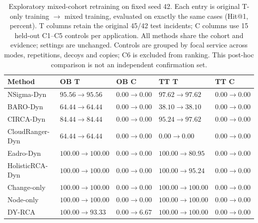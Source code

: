\begin{table}[tbp]
\caption{Exploratory mixed-cohort retraining on fixed seed 42. Each entry is original T-only training $\rightarrow$ mixed training, evaluated on exactly the same cases (Hit@1, percent). T columns retain the original 45/42 test incidents; C columns use 15 held-out C1--C5 controls per application. All methods share the cohort and evidence; settings are unchanged. Controls are grouped by focal service across modes, repetitions, decoys and copies; C6 is excluded from ranking. This post-hoc comparison is not an independent confirmation set.}
\label{tab:mixed_cohort}
\resultstable
\begin{tabularx}{\linewidth}{@{}lYYYY@{}}
\toprule
Method & OB T & OB C & TT T & TT C\\
\midrule
NSigma-Dyn & $95.56\!\rightarrow\!95.56$ & $0.00\!\rightarrow\!0.00$ & $97.62\!\rightarrow\!97.62$ & $0.00\!\rightarrow\!0.00$\\
BARO-Dyn & $64.44\!\rightarrow\!64.44$ & $0.00\!\rightarrow\!0.00$ & $38.10\!\rightarrow\!38.10$ & $0.00\!\rightarrow\!0.00$\\
CIRCA-Dyn & $84.44\!\rightarrow\!84.44$ & $0.00\!\rightarrow\!0.00$ & $95.24\!\rightarrow\!97.62$ & $0.00\!\rightarrow\!0.00$\\
CloudRanger-Dyn & $64.44\!\rightarrow\!64.44$ & $0.00\!\rightarrow\!0.00$ & $0.00\!\rightarrow\!0.00$ & $0.00\!\rightarrow\!0.00$\\
Eadro-Dyn & $100.00\!\rightarrow\!100.00$ & $0.00\!\rightarrow\!0.00$ & $100.00\!\rightarrow\!80.95$ & $0.00\!\rightarrow\!0.00$\\
HolisticRCA-Dyn & $100.00\!\rightarrow\!100.00$ & $0.00\!\rightarrow\!0.00$ & $100.00\!\rightarrow\!95.24$ & $0.00\!\rightarrow\!0.00$\\
Change-only & $100.00\!\rightarrow\!100.00$ & $0.00\!\rightarrow\!0.00$ & $100.00\!\rightarrow\!100.00$ & $0.00\!\rightarrow\!0.00$\\
Node-only & $100.00\!\rightarrow\!100.00$ & $0.00\!\rightarrow\!0.00$ & $100.00\!\rightarrow\!100.00$ & $0.00\!\rightarrow\!0.00$\\
DY-RCA & $100.00\!\rightarrow\!93.33$ & $0.00\!\rightarrow\!6.67$ & $100.00\!\rightarrow\!100.00$ & $0.00\!\rightarrow\!0.00$\\
\bottomrule
\end{tabularx}
\end{table}

